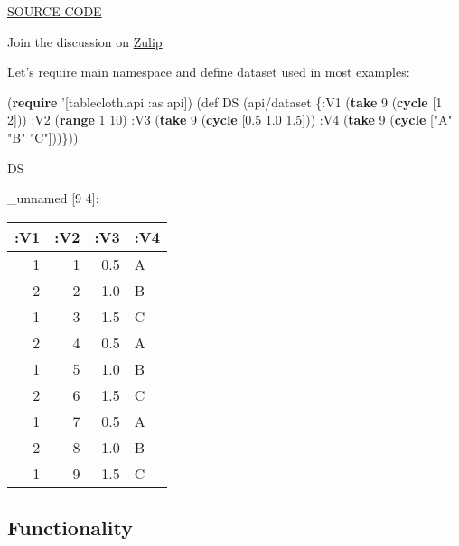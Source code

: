 \documentclass[]{article}
\newenvironment{Shaded}{\begin{snugshade}}{\end{snugshade}}
\newcommand{\KeywordTok}[1]{\textcolor[rgb]{0.13,0.29,0.53}{\textbf{#1}}}
\newcommand{\DecValTok}[1]{\textcolor[rgb]{0.00,0.00,0.81}{#1}}
\newcommand{\FloatTok}[1]{\textcolor[rgb]{0.00,0.00,0.81}{#1}}
\newcommand{\StringTok}[1]{\textcolor[rgb]{0.31,0.60,0.02}{#1}}
\newcommand{\FunctionTok}[1]{\textcolor[rgb]{0.00,0.00,0.00}{#1}}
\newcommand{\BuiltInTok}[1]{#1}
\newcommand{\AttributeTok}[1]{\textcolor[rgb]{0.77,0.63,0.00}{#1}}
\newcommand{\NormalTok}[1]{#1}
\begin{document}
\href{https://github.com/scicloj/tablecloth}{SOURCE CODE}

Join the discussion on
\href{https://clojurians.zulipchat.com/\#narrow/stream/236259-tech.2Eml.2Edataset.2Edev/topic/api}{Zulip}

Let's require main namespace and define dataset used in most examples:

\begin{Shaded}
\begin{Highlighting}[]
\NormalTok{(}\KeywordTok{require}\NormalTok{ '[tablecloth.api }\AttributeTok{:as}\NormalTok{ api])}
\NormalTok{(}\BuiltInTok{def}\FunctionTok{ DS }\NormalTok{(api/dataset \{}\AttributeTok{:V1}\NormalTok{ (}\KeywordTok{take} \DecValTok{9}\NormalTok{ (}\KeywordTok{cycle}\NormalTok{ [}\DecValTok{1} \DecValTok{2}\NormalTok{]))}
                      \AttributeTok{:V2}\NormalTok{ (}\KeywordTok{range} \DecValTok{1} \DecValTok{10}\NormalTok{)}
                      \AttributeTok{:V3}\NormalTok{ (}\KeywordTok{take} \DecValTok{9}\NormalTok{ (}\KeywordTok{cycle}\NormalTok{ [}\FloatTok{0.5} \FloatTok{1.0} \FloatTok{1.5}\NormalTok{]))}
                      \AttributeTok{:V4}\NormalTok{ (}\KeywordTok{take} \DecValTok{9}\NormalTok{ (}\KeywordTok{cycle}\NormalTok{ [}\StringTok{"A"} \StringTok{"B"} \StringTok{"C"}\NormalTok{]))\}))}
\end{Highlighting}
\end{Shaded}

\begin{Shaded}
\begin{Highlighting}[]
\NormalTok{DS}
\end{Highlighting}
\end{Shaded}

\_unnamed {[}9 4{]}:

\begin{longtable}[]{@{}rrrl@{}}
\toprule
:V1 & :V2 & :V3 & :V4\tabularnewline
\midrule
\endhead
1 & 1 & 0.5 & A\tabularnewline
2 & 2 & 1.0 & B\tabularnewline
1 & 3 & 1.5 & C\tabularnewline
2 & 4 & 0.5 & A\tabularnewline
1 & 5 & 1.0 & B\tabularnewline
2 & 6 & 1.5 & C\tabularnewline
1 & 7 & 0.5 & A\tabularnewline
2 & 8 & 1.0 & B\tabularnewline
1 & 9 & 1.5 & C\tabularnewline
\bottomrule
\end{longtable}

\subsection{Functionality}\label{functionality}
\end{document}
